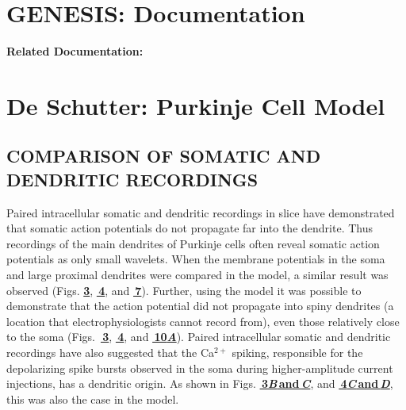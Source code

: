 \documentclass[12pt]{article}
\begin{document}
\section*{GENESIS: Documentation}

{\bf Related Documentation:}

\section*{De Schutter: Purkinje Cell Model}

\subsection*{COMPARISON OF SOMATIC AND DENDRITIC RECORDINGS}

Paired intracellular somatic and dendritic recordings in
slice have demonstrated that somatic action potentials do
not propagate far into the dendrite. Thus recordings of the
main dendrites of Purkinje cells often reveal somatic action
potentials as only small wavelets. When the membrane potentials
in the soma and large proximal dendrites were compared
in the model, a similar result was observed (Figs. \href{../pub-purkinje-deschutter1-fig-3/pub-purkinje-deschutter1-fig-3.tex}{\bf 3},  \href{../pub-purkinje-deschutter1-fig-4/pub-purkinje-deschutter1-fig-4.tex}{\bf\,4},
and \href{../pub-purkinje-deschutter1-fig-7/pub-purkinje-deschutter1-fig-7.tex}{\bf\,7}). Further, using the model it was possible to demonstrate
that the action potential did not propagate into spiny
dendrites (a location that electrophysiologists cannot record
from), even those relatively close to the soma (Figs. \,\href{../pub-purkinje-deschutter1-fig-3/pub-purkinje-deschutter1-fig-3.tex}{\bf\,3},
 \href{../pub-purkinje-deschutter1-fig-4/pub-purkinje-deschutter1-fig-4.tex}{\bf\,4}, and  \href{../pub-purkinje-deschutter1-fig-10/pub-purkinje-deschutter1-fig-10.tex}{\bf\,10{\it A}}).
Paired intracellular somatic and dendritic recordings
have also suggested that the Ca$^{2+}$ spiking, responsible for
the depolarizing spike bursts observed in the soma during
higher-amplitude current injections, has a dendritic origin.
As shown in Figs.  \href{../pub-purkinje-deschutter1-fig-3pub-purkinje-deschutter1-fig-3.tex}{\bf\,3{\it B}\,and\,{\it C}}, and \href{../pub-purkinje-deschutter1-fig-4/pub-purkinje-deschutter1-fig-4.tex}{\bf\,4{\it C}\,and\,{\it D}}, this was also
the case in the model.



\end{document}
